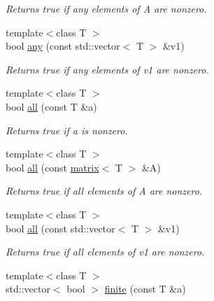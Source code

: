 \begin{DoxyCompactItemize}
\begin{DoxyCompactList}\small\item\em Returns true if any elements of A are nonzero. \end{DoxyCompactList}\item 
\hypertarget{namespacekeycpp_a01b100190bc21b024340b7bddd4467dd}{{\footnotesize template$<$class T $>$ }\\bool \hyperlink{namespacekeycpp_a01b100190bc21b024340b7bddd4467dd}{any} (const std\-::vector$<$ T $>$ \&v1)}\label{namespacekeycpp_a01b100190bc21b024340b7bddd4467dd}

\begin{DoxyCompactList}\small\item\em Returns true if any elements of v1 are nonzero. \end{DoxyCompactList}\item 
\hypertarget{namespacekeycpp_aab77d82d9cc7d1fcca87967048f09e0e}{{\footnotesize template$<$class T $>$ }\\bool \hyperlink{namespacekeycpp_aab77d82d9cc7d1fcca87967048f09e0e}{all} (const T \&a)}\label{namespacekeycpp_aab77d82d9cc7d1fcca87967048f09e0e}

\begin{DoxyCompactList}\small\item\em Returns true if a is nonzero. \end{DoxyCompactList}\item 
\hypertarget{namespacekeycpp_a0ebd51ca90981278382a922c04ee7a75}{{\footnotesize template$<$class T $>$ }\\bool \hyperlink{namespacekeycpp_a0ebd51ca90981278382a922c04ee7a75}{all} (const \hyperlink{classkeycpp_1_1matrix}{matrix}$<$ T $>$ \&A)}\label{namespacekeycpp_a0ebd51ca90981278382a922c04ee7a75}

\begin{DoxyCompactList}\small\item\em Returns true if all elements of A are nonzero. \end{DoxyCompactList}\item 
\hypertarget{namespacekeycpp_adcb91abe9a1d64046037bced47b7b466}{{\footnotesize template$<$class T $>$ }\\bool \hyperlink{namespacekeycpp_adcb91abe9a1d64046037bced47b7b466}{all} (const std\-::vector$<$ T $>$ \&v1)}\label{namespacekeycpp_adcb91abe9a1d64046037bced47b7b466}

\begin{DoxyCompactList}\small\item\em Returns true if all elements of v1 are nonzero. \end{DoxyCompactList}\item 
\hypertarget{namespacekeycpp_a03069647e77ae29e5437553b98274634}{{\footnotesize template$<$class T $>$ }\\std\-::vector$<$ bool $>$ \hyperlink{namespacekeycpp_a03069647e77ae29e5437553b98274634}{finite} (const T \&a)}\label{namespacekeycpp_a03069647e77ae29e5437553b98274634}


\end{DoxyCompactItemize}

